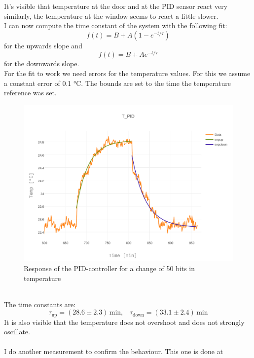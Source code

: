 \documentclass[12pt]{scrartcl}
\begin{document}
      It's visible that temperature at the door and at the PID sensor react
      very similarly, the temperature at the window seems to react a little
      slower.\\
      I can now compute the time constant of the system with the following fit:
      \begin{equation*}
        f(t) = B + A(1-e^{-t/\tau})
      \end{equation*}
      for the upwards slope and
      \begin{equation*}
        f(t) = B + A e^{-t/\tau}
      \end{equation*}
      for the downwards slope. \\
      For the fit to work we need errors for the temperature values. For this
      we assume a constant error of 0.1 °C. The bounds are set to the time the
      temperature reference was set.
      \begin{figure}[h!]
        \centering
        \includegraphics[width = \textwidth]{./plots/plot_image(12)}
        \caption{Response of the PID-controller for a change of 50 bits in
        temperature}
        \label{fig13}
      \end{figure}\\
      The time constants are:
      $$\tau_{\text{up}} = (28.6 \pm 2.3) \,\text{min}, \;\;\; \tau_{\text{down}} =
      (33.1 \pm 2.4)\,\text{min}$$
      It is also visible that the temperature does not overshoot and does not
      strongly oscillate. \\\\
      I do another measurement to confirm the behaviour. This one is done at
\end{document}
